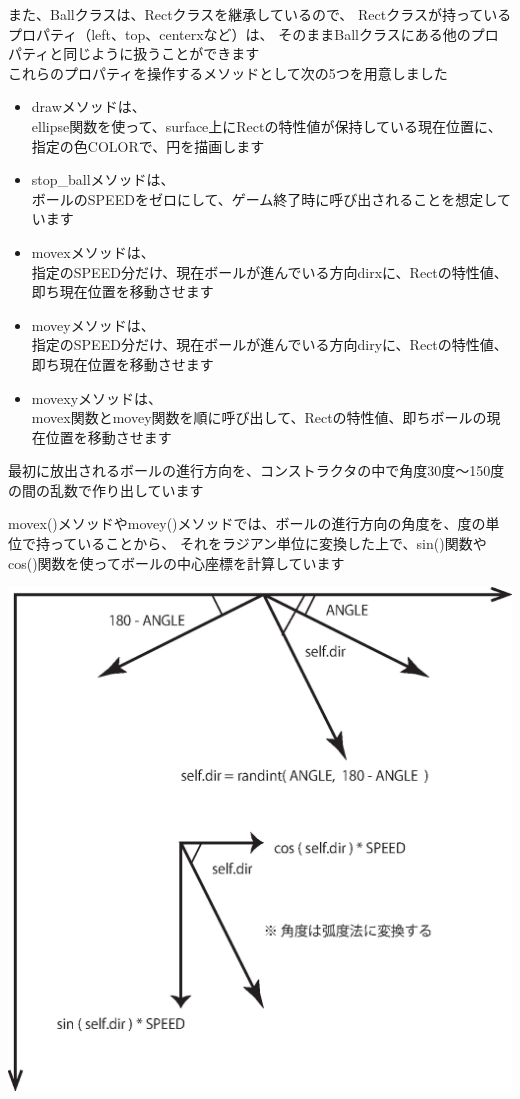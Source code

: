 \documentclass[uplatex,a4paper,11pt,oneside,openany]{jsbook}
\begin{document}
また、Ballクラスは、Rectクラスを継承しているので、
Rectクラスが持っているプロパティ（left、top、centerxなど）は、
そのままBallクラスにある他のプロパティと同じように扱うことができます\\

これらのプロパティを操作するメソッドとして次の5つを用意しました

\begin{itemize}
  \item drawメソッドは、\\ellipse関数を使って、surface上にRectの特性値が保持している現在位置に、指定の色COLORで、円を描画します
  \item stop\_ballメソッドは、\\ボールのSPEEDをゼロにして、ゲーム終了時に呼び出されることを想定しています
  \item movexメソッドは、\\指定のSPEED分だけ、現在ボールが進んでいる方向dirxに、Rectの特性値、即ち現在位置を移動させます
  \item moveyメソッドは、\\指定のSPEED分だけ、現在ボールが進んでいる方向diryに、Rectの特性値、即ち現在位置を移動させます
  \item movexyメソッドは、\\movex関数とmovey関数を順に呼び出して、Rectの特性値、即ちボールの現在位置を移動させます
\end{itemize}

最初に放出されるボールの進行方向を、コンストラクタの中で角度30度〜150度の間の乱数で作り出しています

movex()メソッドやmovey()メソッドでは、ボールの進行方向の角度を、度の単位で持っていることから、
それをラジアン単位に変換した上で、sin()関数やcos()関数を使ってボールの中心座標を計算しています

\begin{center}
  \includegraphics[width=0.4\hsize]{./figure/startball.eps}
\end{center}
\end{document}
